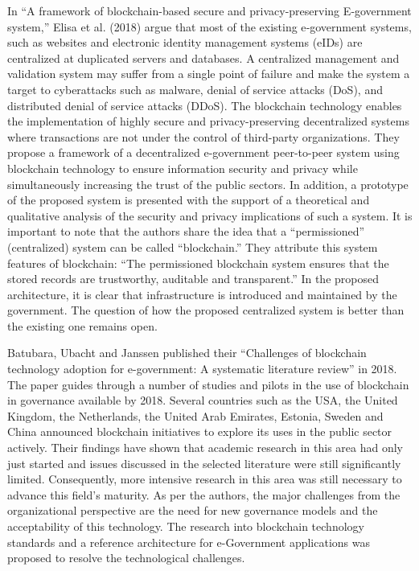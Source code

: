 \begin{multicols}{2}
In “A framework of blockchain-based secure and privacy-preserving E‑government system,” \cite{art1-key10} Elisa et al. (2018) argue that most of the existing e‑government systems, such as websites and electronic identity management systems (eIDs) are centralized at duplicated servers and databases. A centralized management and validation system may suffer from a single point of failure and make the system a target to cyberattacks such as malware, denial of service attacks (DoS), and distributed denial of service attacks (DDoS). The blockchain technology enables the implementation of highly secure and privacy-preserving decentralized systems where transactions are not under the control of third-party organizations. They propose a framework of a decentralized e-government peer-to-peer system using blockchain technology to ensure information security and privacy while simultaneously increasing the trust of the public sectors. In addition, a prototype of the proposed system is presented with the support of a theoretical and qualitative analysis of the security and privacy implications of such a system. It is important to note that the authors share the idea that a “permissioned” (centralized) system can be called “blockchain.” They attribute this system features of blockchain: “The permissioned blockchain system ensures that the stored records are trustworthy, auditable and transparent.” In the proposed architecture, it is clear that infrastructure is introduced and maintained by the government. The question of how the proposed centralized system is better than the existing one remains open.

Batubara, Ubacht and Janssen published their “Challenges of blockchain technology adoption for e-government: A systematic literature review” \cite{art1-key11} in 2018. The paper guides through a number of studies and pilots in the use of blockchain in governance available by 2018. Several countries such as the USA, the United Kingdom, the Netherlands, the United Arab Emirates, Estonia, Sweden and China announced blockchain initiatives to explore its uses in the public sector actively. Their findings have shown that academic research in this area had only just started and issues discussed in the selected literature were still significantly limited. Consequently, more intensive research in this area was still necessary to advance this field's maturity. As per the authors, the major challenges from the organizational perspective are the need for new governance models and the acceptability of this technology. The research into blockchain technology standards and a reference architecture for e-Government applications was proposed to resolve the technological challenges.


\end{multicols}
